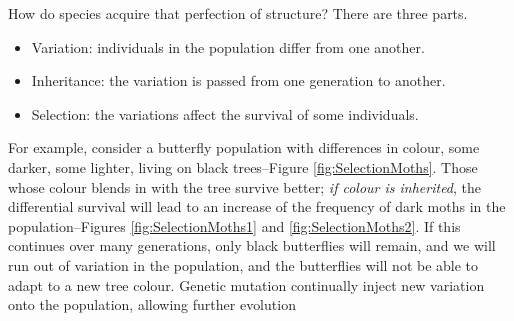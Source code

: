 \documentclass[]{article}
\begin{document}
How do species acquire that perfection of structure? There are three parts.
\begin{itemize}
	\item Variation: individuals in the population differ from one another.
	\item Inheritance: the variation is passed from one generation to another.
	\item Selection: the variations affect the survival of some individuals.
\end{itemize}

For example, consider a butterfly population with differences in colour, some darker, some lighter, living on black trees--Figure \ref{fig:SelectionMoths}. Those whose colour blends in with the tree survive better; \emph{ if colour is inherited}, the differential survival will lead to an increase of the frequency of dark moths in the population--Figures \ref{fig:SelectionMoths1} and  \ref{fig:SelectionMoths2}. If this continues over many generations, only black butterflies will remain, and we will run out of variation in the population, and the butterflies will not be able to adapt to a new tree colour. Genetic mutation continually inject new variation onto the population, allowing further evolution
\end{document}
